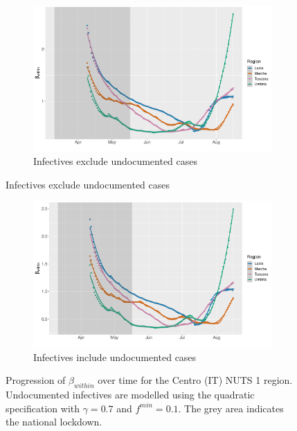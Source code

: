 \documentclass[12pt]{article}
\begin{document}
\begin{appendices}
		\begin{figure}[H]
    	    \centering
    	    \begin{subfigure}{\textwidth}
    	      \centering
    	      \includegraphics[width=0.94\linewidth]{output/model_within_lag14_betawithin_Centro (IT)_rollingwindow30.pdf}
    	      \caption{Infectives exclude undocumented cases}
    	      \label{fig:beta_within_over_time_centro_lowsample_regular}
    	    \end{subfigure}
        \end{figure}
        \begin{figure}[H]\ContinuedFloat
    	    \begin{subfigure}{\textwidth}
    	      \centering
    	      \includegraphics[width=0.94\linewidth]{output/model_within_lag14_betawithin_Centro (IT)_UndocQuadratic_rollingwindow30.pdf}
    	      \caption{Infectives include undocumented cases}
    	      \label{fig:beta_within_over_time_centro_lowsample_regular_undoc}
    	    \end{subfigure}
    	    \caption{Progression of $\beta_{within}$ over time for the Centro (IT) NUTS 1 region. Undocumented infectives are modelled using the quadratic specification with $\gamma = 0.7$ and $f^{min}=0.1$. The grey area indicates the national lockdown.}
    	    \label{fig:beta_within_over_time_centro_lowsample}
	    \end{figure}
		

\end{appendices}
\end{document}
